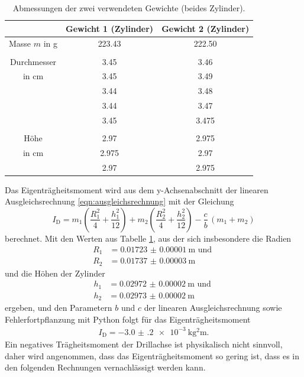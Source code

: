 \begin{table}
  \centering
  \begin{tabular}{c| c c}
    \toprule
        & Gewicht 1 (Zylinder) & Gewicht 2 (Zylinder)\\
    \midrule
    Masse $m$ in \si{\gram} & 223.43 & 222.50\\
    & & \\
    Durchmesser          & 3.45 & 3.46  \\
    in \si{\centi\meter} & 3.45 & 3.49  \\
                         & 3.44 & 3.48  \\
                         & 3.44 & 3.47  \\
                         & 3.45 & 3.475 \\
    & & \\
    Höhe                 & 2.97 & 2.975 \\
    in \si{\centi\meter} & 2.975 & 2.97 \\
                         & 2.97 & 2.975 \\
    \bottomrule
  \end{tabular}
  \caption{Abmessungen der zwei verwendeten Gewichte (beides Zylinder).}
  \label{tab:gewichte}
\end{table}
\noindent Das Eigenträgheitsmoment wird aus dem y-Achsenabschnitt der linearen
Ausgleichsrechnung \eqref{eqn:ausgleichsrechnung} mit der Gleichung
\begin{equation}
  I_\text{D} = m_1\left(\frac{R_1^2}{4} + \frac{h_1^2}{12}\right) + m_2 \left(
  \frac{R_2^2}{4}+\frac{h_2^2}{12}\right) - \frac{c}{b}\, (m_1 + m_2)
  \label{eqn:eigentraegheitsmoment}
\end{equation}
berechnet. Mit den Werten aus Tabelle \ref{tab:gewichte}, aus der sich insbesondere
die Radien
\begin{align*}
  R_1 &= \SI{0.01723(1)}{\meter} \text{ und }\\
  R_2 &= \SI{0.01737(3)}{\meter}
\end{align*}
und die Höhen der Zylinder
\begin{align*}
  h_1 &= \SI{0.02972(2)}{\meter} \text{ und } \\
  h_2 &= \SI{0.02973(2)}{\meter}
\end{align*}
ergeben, und den Parametern $b$ und $c$ der linearen Ausgleichsrechnung sowie
Fehlerfortpflanzung mit Python folgt für das Eigenträgheitsmoment
\begin{align*}
  I_\text{D} = \SI{-3.0(2)e-3}{\kilo\gram\squared\meter}.
\end{align*}
Ein negatives Trägheitsmoment der Drillachse ist physikalisch nicht sinnvoll,
daher wird angenommen, dass das Eigenträgheitsmoment so gering ist, dass es
in den folgenden Rechnungen vernachlässigt werden kann.

